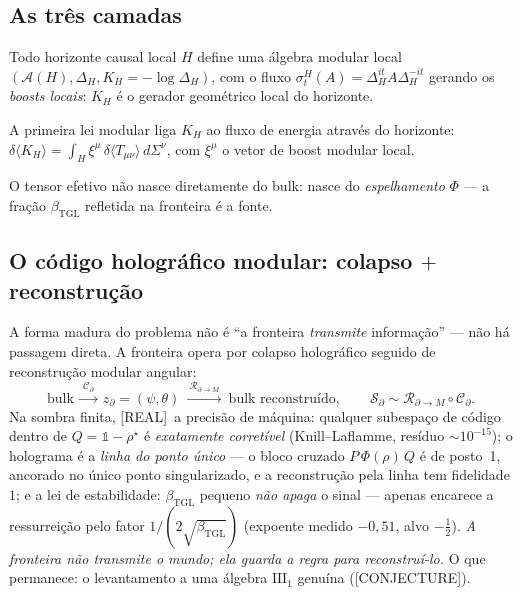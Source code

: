 \documentclass[11pt,a4paper]{article}
\newcommand{\REAL}{\textsf{[REAL]}}
\newcommand{\CONJ}{\textsf{[CONJECTURE]}}
\newcommand{\bTGL}{\beta_{\mathrm{TGL}}}
\newcommand{\Alg}{\mathcal A}
\begin{document}
\subsection{As três camadas}
\begin{description}[style=unboxed,leftmargin=1.5em,noitemsep]
\item[(I) Local --- \REAL\ (Bisognano--Wichmann).] Todo horizonte causal
local $H$ define uma álgebra modular local
$(\Alg(H),\Delta_H,K_H=-\log\Delta_H)$, com o fluxo
$\sigma_t^H(A)=\Delta_H^{it}A\Delta_H^{-it}$ gerando os \emph{boosts
locais}: $K_H$ é o gerador geométrico local do horizonte.
\item[(II) Entrópica --- \REAL\ (Araki/Jacobson).] A primeira lei modular
liga $K_H$ ao fluxo de energia através do horizonte:
$\delta\langle K_H\rangle
=\int_H\xi^\mu\,\delta\langle T_{\mu\nu}\rangle\,d\Sigma^\nu$,
com $\xi^\mu$ o vetor de boost modular local.
\item[(III) TGL --- \CONJ\ (a contribuição própria).] O tensor efetivo não
nasce diretamente do bulk: nasce do \emph{espelhamento} $\Phi$ --- a fração
$\bTGL$ refletida na fronteira é a fonte.
\end{description}

\subsection{O código holográfico modular: colapso $+$ reconstrução}
A forma madura do problema não é ``a fronteira \emph{transmite} informação''
--- não há passagem direta. A fronteira opera por colapso holográfico
seguido de reconstrução modular angular:
\begin{equation}
\text{bulk}\ \xrightarrow{\ \mathcal C_\partial\ }\
z_\partial=(\psi,\theta)
\ \xrightarrow{\ \mathcal R_{\partial\to M}\ }\
\text{bulk reconstruído},
\qquad
\mathcal S_\partial\sim\mathcal R_{\partial\to M}\circ\mathcal C_\partial.
\end{equation}
Na sombra finita, \REAL\ a precisão de máquina: qualquer subespaço de código
dentro de $Q=\mathbb 1-\rho^\star$ é \emph{exatamente corretível}
(Knill--Laflamme, resíduo $\sim10^{-15}$); o holograma é a \emph{linha do
ponto único} --- o bloco cruzado $P\,\Phi(\rho)\,Q$ é de posto~1, ancorado no
único ponto singularizado, e a reconstrução pela linha tem fidelidade $1$;
e a lei de estabilidade: $\bTGL$ pequeno \emph{não apaga} o sinal --- apenas
encarece a ressurreição pelo fator $1/(2\sqrt{\bTGL})$ (expoente medido
$-0{,}51$, alvo $-\tfrac12$). \emph{A fronteira não transmite o mundo; ela
guarda a regra para reconstruí-lo.} O que permanece: o levantamento a uma
álgebra $\mathrm{III}_1$ genuína (\CONJ).
\end{document}
